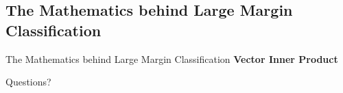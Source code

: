 \documentclass[9pt,dvipsnames]{beamer}
\begin{document}
\subsection{The Mathematics behind Large Margin Classification}
\begin{frame}{The Mathematics behind Large Margin Classification}
	\textbf{Vector Inner Product}
\end{frame}
\begin{frame}
	\begin{center}
		\Huge Questions?
	\end{center}
\end{frame}
\end{document}
